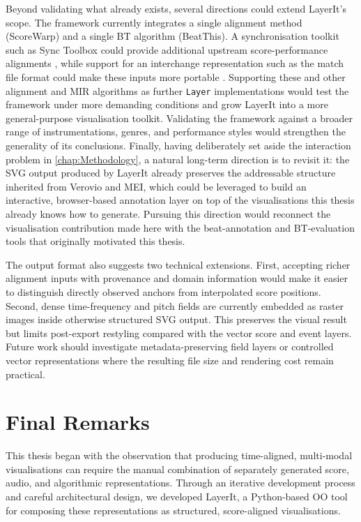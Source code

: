 Beyond validating what already exists, several directions could extend LayerIt's scope. The framework currently integrates a single alignment method (ScoreWarp) and a single BT algorithm (BeatThis). A synchronisation toolkit such as Sync Toolbox could provide additional upstream score-performance alignments \cite{mullerSyncToolbox2021}, while support for an interchange representation such as the match file format could make these inputs more portable \cite{foscarinMatchFileFormat2022}. Supporting these and other alignment and MIR algorithms as further \texttt{Layer} implementations would test the framework under more demanding conditions and grow LayerIt into a more general-purpose visualisation toolkit. Validating the framework against a broader range of instrumentations, genres, and performance styles would strengthen the generality of its conclusions. Finally, having deliberately set aside the interaction problem in \autoref{chap:Methodology}, a natural long-term direction is to revisit it: the SVG output produced by LayerIt already preserves the addressable structure inherited from Verovio and MEI, which could be leveraged to build an interactive, browser-based annotation layer on top of the visualisations this thesis already knows how to generate. Pursuing this direction would reconnect the visualisation contribution made here with the beat-annotation and BT-evaluation tools that originally motivated this thesis.

The output format also suggests two technical extensions. First, accepting richer alignment inputs with provenance and domain information would make it easier to distinguish directly observed anchors from interpolated score positions. Second, dense time-frequency and pitch fields are currently embedded as raster images inside otherwise structured SVG output. This preserves the visual result but limits post-export restyling compared with the vector score and event layers. Future work should investigate metadata-preserving field layers or controlled vector representations where the resulting file size and rendering cost remain practical.

\section{Final Remarks}
This thesis began with the observation that producing time-aligned, multi-modal visualisations can require the manual combination of separately generated score, audio, and algorithmic representations. Through an iterative development process and careful architectural design, we developed LayerIt, a Python-based OO tool for composing these representations as structured, score-aligned visualisations.

